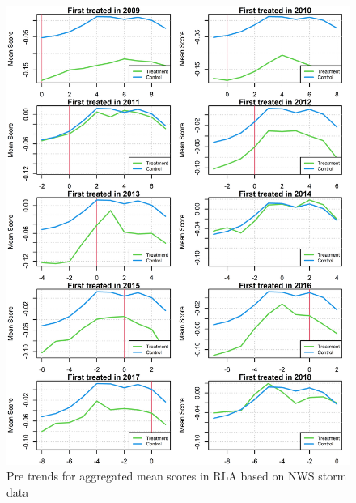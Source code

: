 \begin{figure}[!h]
	\centering
	\includegraphics[scale=1]{"../Code & Data/ParTrendsPlotRLAStorm.png"}
	\caption{Pre trends for aggregated mean scores in RLA based on NWS storm data}
	\label{PreTrendsRLA}
\end{figure}



